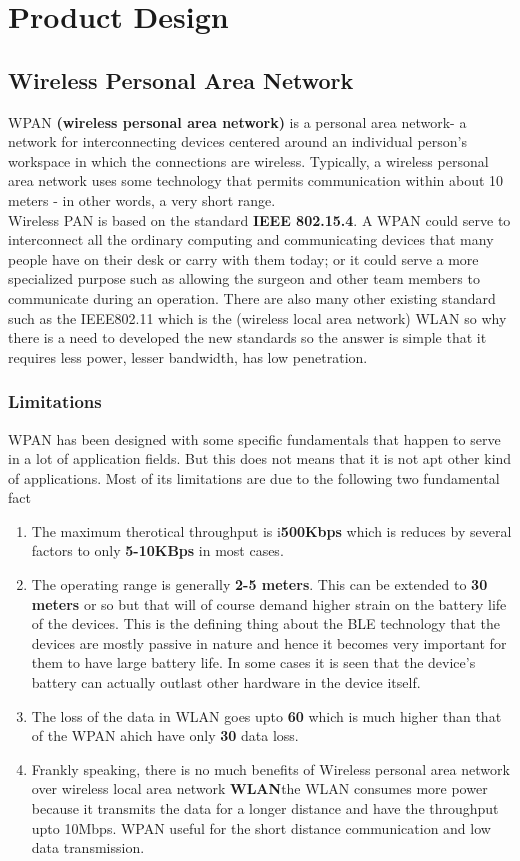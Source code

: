 \chapter{Product Design}
\section{Wireless Personal Area Network}
WPAN \textbf{(wireless personal area network)} is a personal area network- a network for interconnecting devices centered around an individual person's workspace in which the connections are wireless. Typically, a wireless personal area network uses some technology that permits communication within about 10 meters - in other words, a very short range.\\
Wireless PAN is based on the standard \textbf{IEEE 802.15.4}. A WPAN could serve to interconnect all the ordinary computing and communicating devices that many people have on their desk or carry with them today; or it could serve a more specialized purpose such as allowing the surgeon and other team members to communicate during an operation. There are also many other existing standard such as the IEEE802.11 which is the (wireless local area network) WLAN so why there is a need to developed the new standards so the answer is simple that it requires less power, lesser  bandwidth, has low penetration.
\subsection{Limitations}
WPAN has been designed with some specific fundamentals that happen to serve in a lot of application fields. But this does not means  that it is not apt other kind of applications. Most of its limitations are due to the following two fundamental fact
\begin{enumerate}
	\item The maximum therotical throughput is i\textbf{500Kbps} which is reduces by several factors to only \textbf{5-10KBps} in most cases.
	\item The operating range is generally \textbf{2-5 meters}. This can be extended to \textbf{30 meters} or so but that will of course demand higher strain on the battery life of the devices. This is the defining thing about the BLE technology that the devices are mostly passive in nature and hence it becomes very important for them to have large battery life. In some cases it is seen that the device’s battery can actually outlast other hardware in the device itself.
	\item The loss of the data in WLAN goes upto \textbf{60} which is much higher than that of the WPAN ahich have only \textbf{30} data loss.
	\item Frankly speaking, there is no much benefits of Wireless personal area network over wireless local area network \textbf{WLAN}the WLAN consumes more power because it transmits the data for a longer distance and have the throughput upto 10Mbps. WPAN useful for the short distance communication and low data transmission.
\end{enumerate}
